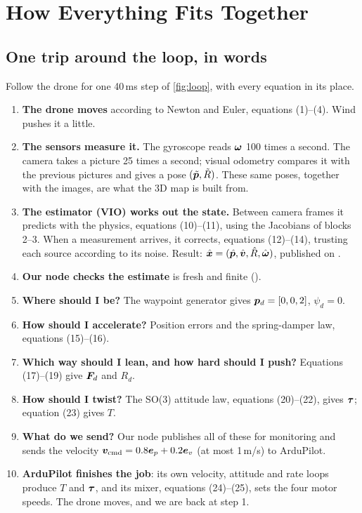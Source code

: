 \section{How Everything Fits Together}
\label{sec:together}

\subsection{One trip around the loop, in words}

Follow the drone for one 40\,ms step of \cref{fig:loop}, with every equation in its place.

\begin{enumerate}
  \item \textbf{The drone moves} according to Newton and Euler, equations (1)--(4). Wind pushes it a little.
  \item \textbf{The sensors measure it.} The gyroscope reads $\bm{\omega}$ 100 times a second. The camera takes a picture 25 times a
        second; visual odometry compares it with the previous pictures and gives a pose $(\tilde{\bm{p}},\tilde R)$. These same poses,
        together with the images, are what the 3D map is built from.
  \item \textbf{The estimator (VIO) works out the state.} Between camera frames it predicts with the physics, equations
        (10)--(11), using the Jacobians of blocks 2--3. When a measurement arrives, it corrects, equations (12)--(14), trusting
        each source according to its noise. Result: $\hat{\bm x}=(\hat{\bm p},\hat{\bm v},\hat{R},\hat{\bm\omega})$, published on .
  \item \textbf{Our node checks the estimate} is fresh and finite ().
  \item \textbf{Where should I be?} The waypoint generator gives $\bm{p}_d=[0,0,2]$, $\psi_d=0$.
  \item \textbf{How should I accelerate?} Position errors and the spring-damper law, equations (15)--(16).
  \item \textbf{Which way should I lean, and how hard should I push?} Equations (17)--(19) give $\bm{F}_d$ and $R_d$.
  \item \textbf{How should I twist?} The SO(3) attitude law, equations (20)--(22), gives $\bm{\tau}$; equation (23) gives $T$.
  \item \textbf{What do we send?} Our node publishes all of these for monitoring and sends the velocity
        $\bm{v}_{\text{cmd}}=0.8\bm{e}_p+0.2\bm{e}_v$ (at most 1\,m/s) to ArduPilot.
  \item \textbf{ArduPilot finishes the job}: its own velocity, attitude and rate loops produce $T$ and $\bm{\tau}$, and its mixer,
        equations (24)--(25), sets the four motor speeds. The drone moves, and we are back at step 1.
\end{enumerate}

